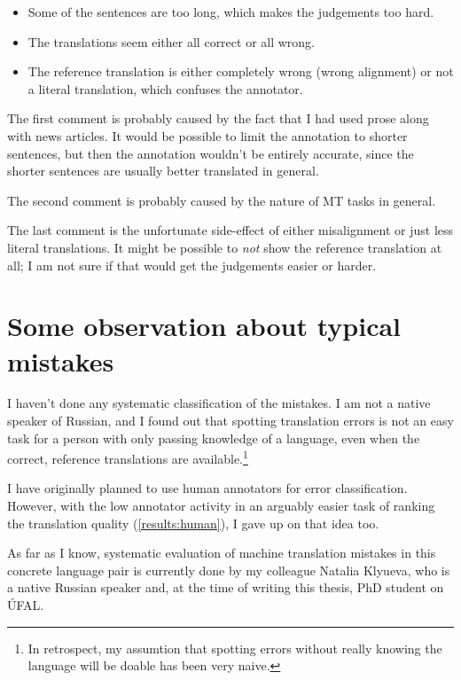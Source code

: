 \begin{itemize}
\item Some of the sentences are too long, which makes the judgements too hard.
\item The translations seem either all correct or all wrong.
\item The reference translation is either completely wrong (wrong alignment) or not a literal translation, which confuses the annotator.
\end{itemize}

The first comment is probably caused by the fact that I had used prose along with news articles. It would be possible to limit the annotation to shorter sentences, but then the annotation wouldn't be entirely accurate, since the shorter sentences are usually better translated in general.

The second comment is probably caused by the nature of MT tasks in general.

The last comment is the unfortunate side-effect of either misalignment or just less literal translations. It might be possible to \emph{not} show the reference translation at all; I am not sure if that would get the judgements easier or harder.

\section{Some observation about typical mistakes}
I haven't done any systematic classification of the mistakes. I am not a native speaker of Russian, and I found out that spotting translation errors is not an easy task for a person with only passing knowledge of a language, even when the correct, reference translations are available.\footnote{In retrospect, my assumtion that spotting errors without really knowing the language will be doable has been very naive.}

I have originally planned to use human annotators for error classification. However, with the low annotator activity in an arguably easier task of ranking the translation quality (\ref{results:human}), I gave up on that idea too.

As far as I know, systematic evaluation of machine translation mistakes in this concrete language pair is currently done by my colleague Natalia Klyueva, who is a native Russian speaker and, at the time of writing this thesis, PhD student on ÚFAL.

